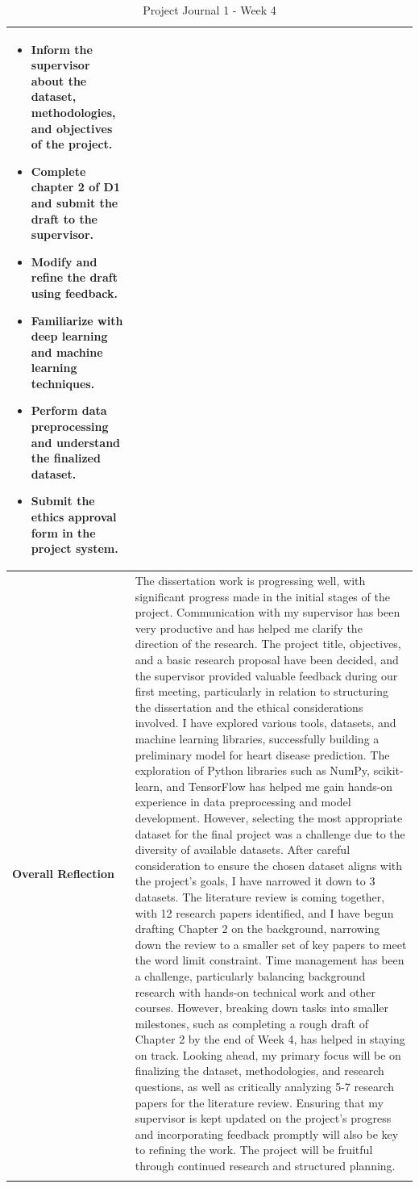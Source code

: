 \begin{longtable}{|p{4cm}|p{11cm}|}
\begin{itemize}
    \item Inform the supervisor about the dataset, methodologies, and objectives of the project.
    \item Complete chapter 2 of D1 and submit the draft to the supervisor.
    \item Modify and refine the draft using feedback.
    \item Familiarize with deep learning and machine learning techniques.
    \item Perform data preprocessing and understand the finalized dataset.
    \item Submit the ethics approval form in the project system.
\end{itemize} \\
\hline
\textbf{Overall Reflection} &
The dissertation work is progressing well, with significant progress made in the initial stages of the project. Communication with my supervisor has been very productive and has helped me clarify the direction of the research. The project title, objectives, and a basic research proposal have been decided, and the supervisor provided valuable feedback during our first meeting, particularly in relation to structuring the dissertation and the ethical considerations involved.  
I have explored various tools, datasets, and machine learning libraries, successfully building a preliminary model for heart disease prediction. The exploration of Python libraries such as NumPy, scikit-learn, and TensorFlow has helped me gain hands-on experience in data preprocessing and model development. However, selecting the most appropriate dataset for the final project was a challenge due to the diversity of available datasets. After careful consideration to ensure the chosen dataset aligns with the project’s goals, I have narrowed it down to 3 datasets.
The literature review is coming together, with 12 research papers identified, and I have begun drafting Chapter 2 on the background, narrowing down the review to a smaller set of key papers to meet the word limit constraint. Time management has been a challenge, particularly balancing background research with hands-on technical work and other courses. However, breaking down tasks into smaller milestones, such as completing a rough draft of Chapter 2 by the end of Week 4, has helped in staying on track. 
Looking ahead, my primary focus will be on finalizing the dataset, methodologies, and research questions, as well as critically analyzing 5-7 research papers for the literature review. Ensuring that my supervisor is kept updated on the project’s progress and incorporating feedback promptly will also be key to refining the work. The project will be fruitful through continued research and structured planning.
 \\
\hline
\caption{Project Journal 1 - Week 4}
\end{longtable}
\label{tab:journal1_dissertation_communication}
\vspace{5cm}


